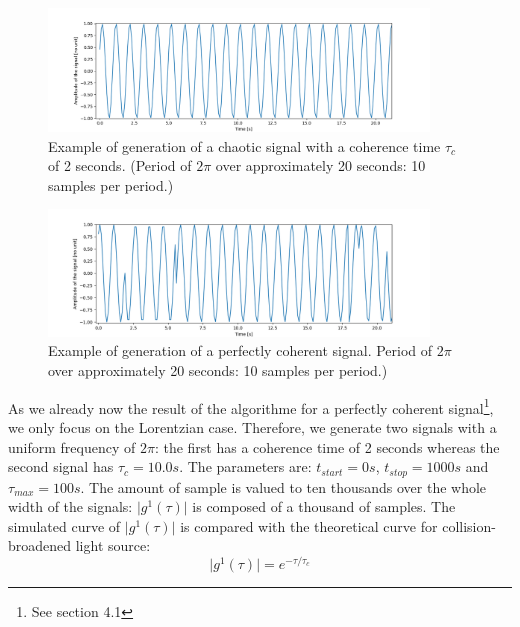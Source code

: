 \documentclass[10pt]{report}
\begin{document}
\begin{figure}[h!]
\caption{Example of generation of a chaotic signal with a coherence time $\tau_c$ of 2 seconds. (Period of $2\pi$ over approximately 20 seconds: 10 samples per period.)}
\centering
\includegraphics[width=0.9\textwidth]{coh_gen}
\end{figure}

\begin{figure}[h!]
\caption{Example of generation of a perfectly coherent signal. Period of $2\pi$ over approximately 20 seconds: 10 samples per period.)}
\centering
\includegraphics[width=0.9\textwidth]{chaos_gen}
\end{figure}

As we already now the result of the algorithme for a perfectly coherent signal\footnote{See section 4.1}, we only focus on the Lorentzian case. Therefore, we generate two signals with a uniform frequency of $2\pi$: the first has a coherence time of 2 seconds whereas the second signal has $\tau_c = 10.0s$. The parameters are: $t_{start} = 0s$, $t_{stop} = 1000s$ and $\tau_{max}=100s$. The amount of sample is valued to ten thousands over the whole width of the signals: $\vert g^1(\tau) \vert$ is composed of a thousand of samples. The simulated curve of $\vert g^1(\tau) \vert$ is compared with the theoretical curve for collision-broadened light source:
\begin{equation}
\vert g^1(\tau) \vert = e^{-\tau/\tau_c}
\end{equation}
\end{document}
